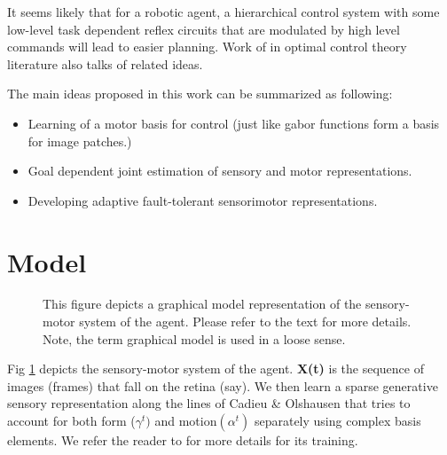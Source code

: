\documentclass[conference]{IEEEtran}
\begin{document}
It seems likely that for a robotic agent, a hierarchical control system with some low-level task dependent reflex circuits that are modulated by high level commands will lead to easier planning. Work of \cite{todorov2004optimality} in optimal control theory literature also talks of related ideas. 

The main ideas proposed in this work can be summarized as following: 
\begin{itemize}
\item Learning of a motor basis for control (just like gabor functions form a basis for image patches.) 
\item Goal dependent joint estimation of sensory and motor representations.
\item Developing adaptive fault-tolerant sensorimotor representations. 
\end{itemize}


\section{Model}
\begin{figure}[t!]
\centering
{} 
\caption{This figure depicts a graphical model representation of the sensory-motor system of the agent. Please refer to the text for more details. Note, the term graphical model is used in a loose sense.}
\label{fig:sesemo}
\end{figure}

Fig \ref{fig:sesemo} depicts the sensory-motor system of the agent. \textbf{X(t)} is the sequence of images (frames) that fall on the retina (say). We then learn a sparse generative sensory representation along the lines of Cadieu \& Olshausen  \cite{cadieu2012learning} that tries to account for both form ($\gamma^{t})$  and motion$(\alpha^{t})$ separately using complex basis elements. We refer the reader to \cite{cadieu2012learning} for more details for its training.
\end{document}
